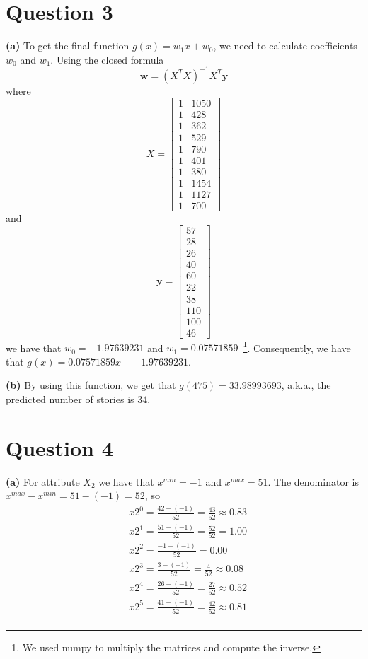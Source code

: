 \documentclass[leqno]{article}
\begin{document}
\section*{Question 3} \textbf{(a)} To get the final function $g(x) = w_1x + w_0$, we need to calculate coefficients $w_0$ and $w_1$. Using the closed 
formula
\begin{equation*}
\textbf{w} = (X^TX)^{-1}X^T\textbf{y}
\end{equation*}
where 
\[
X=
  \begin{bmatrix}
    1 & 1050\\
    1 & 428\\
    1 & 362\\
    1 & 529\\
    1 & 790\\
    1 & 401\\
    1 & 380\\
    1 & 1454\\
    1 & 1127\\
    1 & 700
  \end{bmatrix}
\]
and
\[
\textbf{y}=
  \begin{bmatrix}
     57\\
     28\\
     26\\
     40\\
     60\\
     22\\
     38\\
     110\\
     100\\
     46
  \end{bmatrix}
\]
we have that $w_0 = -1.97639231$ and $w_1 = 0.07571859$~\footnote{We used numpy to multiply the matrices and compute the inverse.}. Consequently,
we have that $g(x) = 0.07571859x + -1.97639231$.

\hfill

\noindent \textbf{(b)} By using this function, we get that $g(475) = 33.98993693$, a.k.a., the predicted number of stories is 34.

\hfill

\section*{Question 4} \textbf{(a)} For attribute $X_2$ we have that $x^{min} = -1$ and $x^{max} = 51$. The denominator is 
$x^{max} - x^{min} = 51 - (-1) = 52$, so
\begin{equation*}
\begin{split}
&x2^0 = \frac{42 - (-1)}{52} = \frac{43}{52} \approx 0.83 \\
&x2^1 = \frac{51 - (-1)}{52} = \frac{52}{52} = 1.00\\
&x2^2 = \frac{-1 - (-1)}{52} = 0.00\\
&x2^3 = \frac{3 - (-1)}{52} = \frac{4}{52} \approx 0.08\\
&x2^4 = \frac{26 - (-1)}{52} = \frac{27}{52} \approx 0.52\\
&x2^5 = \frac{41 - (-1)}{52} = \frac{42}{52} \approx 0.81\\ 
\end{split}
\end{equation*} 
\end{document}
